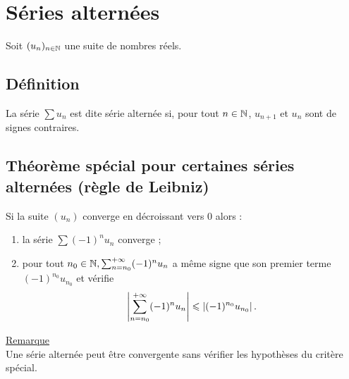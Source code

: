 \section{Séries alternées}
    Soit \((u_n)_{n\in \mathbb{N} }\) une suite de nombres réels.
\subsection{Définition}

\begin{defi}
    La série \(\sum u_n \) est dite série alternée si, pour tout \(n \in  \mathbb{N}\), \(u_{n+1}\) et \(u_n\) sont de signes contraires.
\end{defi}

\subsection{Théorème spécial pour certaines séries alternées (règle de Leibniz)}
\begin{theo}
    Si la suite \((u_n)\) converge en décroissant vers \(0\) alors :
    \begin{enumerate}
        \item la série \(\sum (-1)^n u_n\) converge ;
        \item pour tout \(n_0 \in  \mathbb{N},\sum^{+\infty}_{n=n_0} (-1)^n u_n\) a même signe que son premier terme \((-1)^{n_0} u_{n_0}\) et vérifie 
        \[\left\lvert\sum^{+\infty}_{n=n_0}(-1)^n u_n\right\rvert \leqslant \left\lvert(-1)^{n_0} u_{n_0} \right\rvert.\]
    \end{enumerate}
    \underline{Remarque}\\
    Une série alternée peut être convergente sans vérifier les hypothèses du critère spécial.
\end{theo}